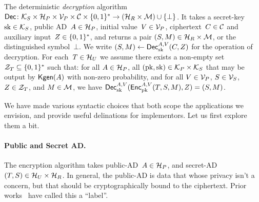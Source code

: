 The deterministic \emph{decryption} algorithm ${\mathsf{Dec}} \colon \mathcal{K}_S \times \mathcal{H}_P \times \mathcal{V}_P \times \mathcal{C} \times \{0,1\}^* \to \left(\mathcal{H}_R \times \mathcal{M}\right) \cup \{\bot\}$.  It takes a secret-key~$\mathrm{sk}\in\mathcal{K}_S$, public AD~$A \in \mathcal{H}_P$, initial value~$V \in \mathcal{V}_P$, ciphertext~$C \in \mathcal{C}$ and auxiliary input~$Z\in\{0,1\}^*$, and returns a pair $(S,M) \in \mathcal{H}_R\times\mathcal{M}$, or the distinguished symbol~$\bot$.  We write $(S,M) \gets {\mathsf{Dec}}_{\mathrm{sk}}^{A,V}(C,Z)$ for the operation of decryption.   For each~$T\in\mathcal{H}_U$ we assume there exists a non-empty set $\mathcal{Z}_T \subseteq \{0,1\}^*$ such that:  for all $A\in\mathcal{H}_P$, all $(\mathrm{pk},\mathrm{sk})\in\mathcal{K}_P\times\mathcal{K}_S$ that may be output by $\mathsf{Kgen}(A)$ with non-zero probability, and for all $V\in\mathcal{V}_P$, $S\in\mathcal{V}_S$, $Z\in\mathcal{Z}_T$,  and $M\in\mathcal{M}$, we have ${\mathsf{Dec}}_{\mathrm{sk}}^{A,V}({\mathsf{Enc}}_{\mathrm{pk}}^{A,V}(T,S,M),Z)=(S,M)$. 

We have made various syntactic choices that both scope the applications we envision, and provide useful delinations for implementors.  Let us first explore them a bit.  

\paragraph{Public and Secret AD. }  
The encryption algorithm takes public-AD~$A \in \mathcal{H}_P$, and secret-AD~$(T,S)\in\mathcal{H}_U\times\mathcal{H}_R$.  In general, the public-AD is data that whose privacy isn't a concern, but that should be cryptographically bound to the ciphertext.  Prior works~\cite{XXX} have called this a ``label''.  


